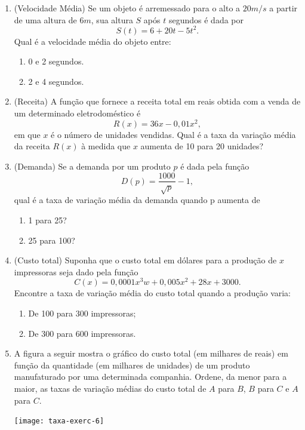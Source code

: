 \begin{enumerate}
    \item (Velocidade Média) Se um objeto é arremessado para o alto a $20m/s$ a partir de uma altura de $6m$, sua altura $S$ após $t$ segundos é dada por
  \[S(t) = 6 + 20t - 5t^2.\]
  Qual é a velocidade média do objeto entre:
  \begin{enumerate}
  \item 0 e 2 segundos.
    \item 2 e 4 segundos.
    \end{enumerate}

    \item (Receita) A função que fornece a receita total em reais obtida com a venda de um determinado eletrodoméstico é
\[ R(x) = 36x - 0,01x^2,\]
em que $x$ é o número de unidades vendidas. Qual é a taxa da variação média da receita $R(x)$ à medida que $x$ aumenta de 10 para 20 unidades?

\item (Demanda) Se a demanda por um produto $p$ é dada pela função 
\[D(p) = \dfrac{1000}{\sqrt{p}} - 1, \]
  qual é a taxa de variação média da demanda quando p aumenta de

  \begin{enumerate}
  \item 1 para 25?
  \item 25 para 100?
  \end{enumerate}

\item (Custo total) Suponha que o custo total em dólares para a produção de $x$ impressoras seja dado pela função
  \[C(x) = 0,0001x^3 w + 0,005x^2 + 28x + 3000.\]
  Encontre a taxa de variação média do custo total quando a produção varia:
  \begin{enumerate}
  \item De 100 para 300 impressoras;
  \item De 300 para 600 impressoras.
  \end{enumerate}

\clearpage

\item A figura a seguir mostra o gráfico do custo total (em milhares de reais) em função da quantidade (em milhares de unidades) de um produto manufaturado por uma determinada companhia. Ordene, da menor para a maior, as taxas de variação médias do custo total de $A$ para $B$, $B$ para $C$ e $A$ para $C$.

  \begin{center}
\texttt{[image: taxa-exerc-6]}
  \end{center}


\end{enumerate}
